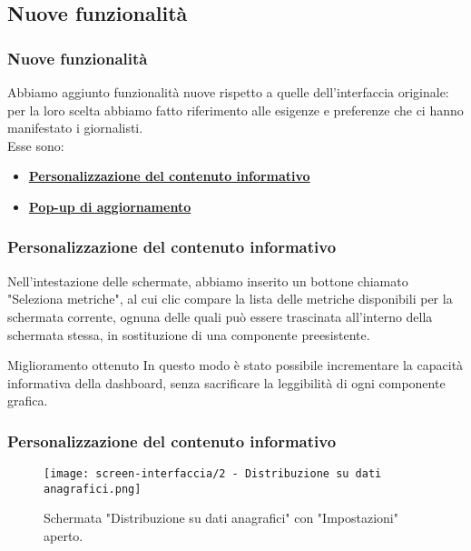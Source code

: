 \subsection{Nuove funzionalità}

\begin{frame}
    \frametitle{Nuove funzionalità}
    Abbiamo aggiunto funzionalità nuove rispetto a quelle dell'interfaccia originale: per la loro scelta abbiamo fatto riferimento alle esigenze e preferenze che ci hanno manifestato i giornalisti.\\
    Esse sono:
    \begin{itemize}
        \item \hyperlink{f:custom}{\textbf{Personalizzazione del contenuto informativo}}
        \item \hyperlink{f:pop}{\textbf{Pop-up di aggiornamento}}        
    \end{itemize}

\end{frame}

\begin{frame}
    \frametitle{Personalizzazione del contenuto informativo}
    \label{f:custom}
    Nell'intestazione delle schermate, abbiamo inserito un bottone chiamato "Seleziona metriche", al cui clic compare la lista delle metriche disponibili per la schermata corrente, ognuna delle quali può essere trascinata all'interno della schermata stessa, in sostituzione di una componente preesistente. 
    \vspace{-30pt}
    \begin{alertblock}{Miglioramento ottenuto}
        In questo modo è stato possibile incrementare la capacità informativa della dashboard, senza sacrificare la leggibilità di ogni componente grafica.        
    \end{alertblock}

\end{frame}

\begin{frame}
    \frametitle{Personalizzazione del contenuto informativo}
    \begin{figure}
        \centering
        \texttt{[image: screen-interfaccia/2 - Distribuzione su dati anagrafici.png]}
        \caption{Schermata "Distribuzione su dati anagrafici" con "Impostazioni" aperto.}
    \end{figure}

\end{frame}

